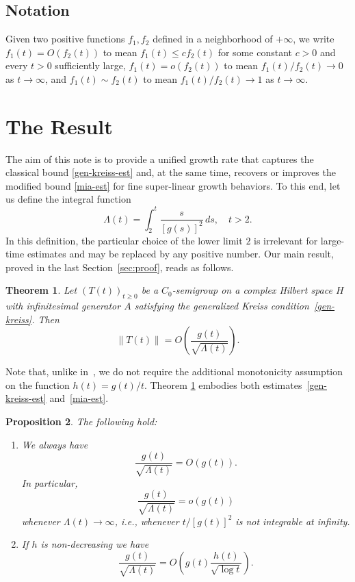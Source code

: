 \documentclass[12pt]{amsart}
\theoremstyle{plain}
\newtheorem{theorem}{Theorem}[section]
\newtheorem{proposition}[theorem]{Proposition}
\theoremstyle{definition}
\numberwithin{equation}{section}
\newcommand{\T}{(T(t))_{t\ge 0}}
\begin{document}
\subsection*{Notation} Given two positive functions $f_1,f_2$ defined in a neighborhood of $+\infty$,
we write $f_1(t) = O(f_2(t))$ to mean  $f_1(t) \leq c f_2(t)$ for some constant $c>0$ and
every $t > 0$ sufficiently large, $f_1(t) = o(f_2(t))$
to mean $f_1(t)/f_2(t)\to 0$ as $t\to\infty$, and $f_1(t) \sim f_2(t)$ to mean $f_1(t)/f_2(t)\to 1$ as $t\to\infty$.



\section{The Result}

\noindent
The aim of this note is to provide a unified growth rate that captures
the classical bound \eqref{gen-kreiss-est} and, at the same time, recovers
or improves the modified
bound \eqref{mia-est} for fine super-linear growth behaviors.
To this end, let us define the integral function
$$
\Lambda(t) = \int_{2}^t \frac{s}{[g(s)]^2}\, ds,\quad t>2.
$$
In this definition, the particular choice of the lower limit $2$ is irrelevant for large-time
estimates and may be replaced by any positive number.
Our main result, proved in the last Section~\ref{sec:proof}, reads as follows.

\begin{theorem}
\label{thm-kreiss}
Let $\T$ be a $C_0$-semigroup on a complex Hilbert space $H$ with infinitesimal generator $A$
satisfying the generalized Kreiss condition~\eqref{gen-kreiss}.
Then
$$
\|T (t)\|= O\left(\frac{g(t)}{\sqrt{\Lambda(t)}}\right).
$$
\end{theorem}

Note that, unlike in~\cite{DE}, we do not
require the additional monotonicity assumption on the function $h(t)=g(t)/t$.
Theorem \ref{thm-kreiss} embodies both
estimates~\eqref{gen-kreiss-est} and~\eqref{mia-est}.

\begin{proposition}
\label{coro}
The following hold:
\begin{enumerate}
\item[\rm (i)] We always have
$$\frac{g(t)}{\sqrt{\Lambda(t)}}=O(g(t)).$$
In particular,
$$\frac{g(t)}{\sqrt{\Lambda(t)}}=o(g(t))$$
whenever $\Lambda(t)\to\infty$, i.e., whenever $t/[g(t)]^2$ is not integrable at infinity.
\vskip2mm
\item[\rm (ii)] If $h$ is non-decreasing we have
$$
\frac{g(t)}{\sqrt{\Lambda(t)}} = O\left(g(t)\frac{h(t)}{\sqrt{\log t}}\right).
$$
\end{enumerate}
\end{proposition}
\end{document}
